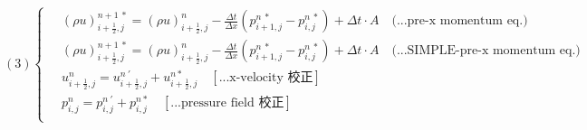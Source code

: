 \documentclass[12pt]{article}
\begin{document}
\begin{equation}
(3)
\left\{
\begin{aligned}
    \ &(\rho u)_{i+\frac{1}{2},j}^{n+1\ *} = (\rho u)_{i+\frac{1}{2},j}^{n} - \frac{\Delta t}{\Delta x}(p_{i+1,j}^{n\ *} - p_{i,j}^{n\ *}) + \Delta t \cdot A \quad \text{(...pre-x momentum eq.)}\\[1.5ex]
    \ &(\rho u)_{i+\frac{1}{2},j}^{n+1\ *} = (\rho u)_{i+\frac{1}{2},j}^{n} - \frac{\Delta t}{\Delta x}(p_{i+1,j}^{n\ *} - p_{i,j}^{n\ *}) + \Delta t \cdot A  \quad \text{(...SIMPLE-pre-x momentum eq.)}\\[1.5ex]
    \ &u_{i+\frac{1}{2},j}^{n} = u_{i+\frac{1}{2},j}^{n\ '} + u_{i+\frac{1}{2},j}^{n *}  \quad \left[\text{...x-velocity 校正}\right]\\[1.5ex]
    \ &p_{i,j}^{n} = p_{i,j}^{n\ '} + p_{i,j}^{n *} \quad\left[\text{...pressure field 校正}\right]\\[1.5ex]
\end{aligned}
\right.
\end{equation}

\newpage
\end{document}
